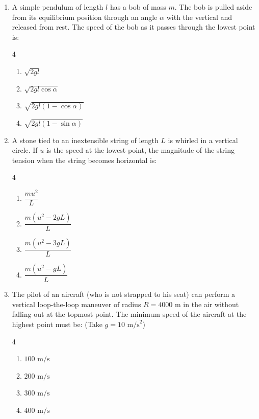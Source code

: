 \documentclass[11pt,a4paper]{article}
\begin{document}
\begin{enumerate}[label=\textbf{\arabic*.},leftmargin=18pt,itemsep=8pt,resume]
  \item A simple pendulum of length $l$ has a bob of mass $m$. The bob is pulled aside from its equilibrium position through an angle $\alpha$ with the vertical and released from rest. The speed of the bob as it passes through the lowest point is:
  \begin{multicols}{4}
    \begin{enumerate}[label=(\Alph*)]
      \item $\sqrt{2gl}$
      \item $\sqrt{2gl\cos\alpha}$
      \item $\sqrt{2gl(1 - \cos\alpha)}$
      \item $\sqrt{2gl(1 - \sin\alpha)}$
    \end{enumerate}
  \end{multicols}

  \item A stone tied to an inextensible string of length $L$ is whirled in a vertical circle. If $u$ is the speed at the lowest point, the magnitude of the string tension when the string becomes horizontal is:
  \begin{multicols}{4}
    \begin{enumerate}[label=(\Alph*)]
      \item $\dfrac{m u^2}{L}$
      \item $\dfrac{m(u^2 - 2gL)}{L}$
      \item $\dfrac{m(u^2 - 3gL)}{L}$
      \item $\dfrac{m(u^2 - gL)}{L}$
    \end{enumerate}
  \end{multicols}

  \item The pilot of an aircraft (who is not strapped to his seat) can perform a vertical loop-the-loop maneuver of radius $R = 4000\text{ m}$ in the air without falling out at the topmost point. The minimum speed of the aircraft at the highest point must be: (Take $g = 10\text{ m/s}^2$)
  \begin{multicols}{4}
    \begin{enumerate}[label=(\Alph*)]
      \item $100\text{ m/s}$
      \item $200\text{ m/s}$
      \item $300\text{ m/s}$
      \item $400\text{ m/s}$
    \end{enumerate}
  \end{multicols}


\end{enumerate}
\end{document}
